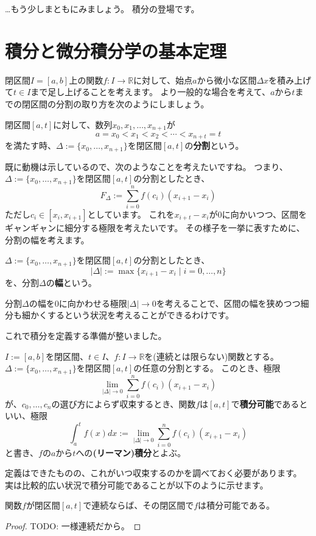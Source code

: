 …もう少しまともにみましょう。
積分の登場です。



\section{積分と微分積分学の基本定理}

閉区間$I=[a,b]$上の関数$f:I\to\mathbb{R}$に対して、始点$a$から微小な区間$\Delta x$を積み上げて$t\in I$まで足し上げることを考えます。
より一般的な場合を考えて、$a$から$t$までの閉区間の分割の取り方を次のようにしましょう。
\begin{definition}
  閉区間$[a,t]$に対して、数列$x_0,x_1,\dots,x_{n+1}$が
  \[
    a=x_0<x_1<x_2<\cdots<x_{n+t}=t
  \]
  を満たす時、$\Delta:=\{x_0,\dots,x_{n+1}\}$を閉区間$[a,t]$の\textbf{分割}という。
\end{definition}
既に動機は示しているので、次のようなことを考えたいですね。
つまり、$\Delta:=\{x_0,\dots,x_{n+1}\}$を閉区間$[a,t]$の分割としたとき、
\[
  F_\Delta:=\sum_{i=0}^n f(c_i)(x_{i+1}-x_i)
\]
ただし$c_i\in[x_i,x_{i+1}]$としています。
これを$x_{i+t}-x_i$が0に向かいつつ、区間をギャンギャンに細分する極限を考えたいです。
その様子を一挙に表すために、分割の幅を考えます。
\begin{definition}
  $\Delta:=\{x_0,\dots,x_{n+1}\}$を閉区間$[a,t]$の分割としたとき、
  \[
    |\Delta|:=\max\{x_{i+1}-x_i\mid i=0,\dots,n\}
  \]
  を、分割$\Delta$の\textbf{幅}という。
\end{definition}
分割$\Delta$の幅を0に向かわせる極限$|\Delta|\to0$を考えることで、区間の幅を狭めつつ細分も細かくするという状況を考えることができるわけです。

これで積分を定義する準備が整いました。
\begin{definition}
  $I:=[a,b]$を閉区間、$t\in I$、$f:I\to\mathbb{R}$を(連続とは限らない)関数とする。
  $\Delta:=\{x_0,\dots,x_{n+1}\}$を閉区間$[a,t]$の任意の分割とする。
  このとき、極限
  \[
    \lim_{|\Delta|\to0}\sum_{i=0}^n f(c_i)(x_{i+1}-x_i)
  \]
  が、$c_0,\dots,c_n$の選び方によらず収束するとき、関数$f$は$[a,t]$で\textbf{積分可能}であるといい、極限
  \[
    \int_a^tf(x)dx:=\lim_{|\Delta|\to0}\sum_{i=0}^n f(c_i)(x_{i+1}-x_i)
  \]
  と書き、$f$の$a$から$t$への\textbf{(リーマン)積分}とよぶ。
\end{definition}

定義はできたものの、これがいつ収束するのかを調べておく必要があります。
実は比較的広い状況で積分可能であることが以下のように示せます。
\begin{theorem}
  関数$f$が閉区間$[a,t]$で連続ならば、その閉区間で$f$は積分可能である。
\end{theorem}
\begin{proof}
  TODO: 一様連続だから。
\end{proof}

